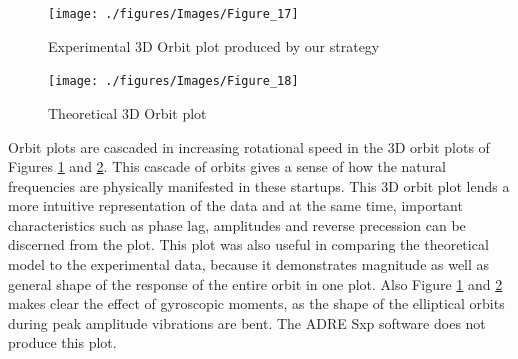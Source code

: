 		\begin{figure}[H]	
			\centering
			\texttt{[image: ./figures/Images/Figure\_17]}
			\caption{Experimental 3D Orbit plot produced by our strategy}
			\label{fig:Figure_17}
		\end{figure}
		\begin{figure}[H]	
			\centering
			\texttt{[image: ./figures/Images/Figure\_18]}
			\caption{Theoretical 3D Orbit plot}
			\label{fig:Figure_18}
		\end{figure}
		Orbit plots are cascaded in increasing rotational speed in the 3D orbit plots of Figures \ref{fig:Figure_17} and \ref{fig:Figure_18}. This cascade of orbits gives a sense of how the natural frequencies are physically manifested in these startups. This 3D orbit plot lends a more intuitive representation of the data and at the same time, important characteristics such as phase lag, amplitudes and reverse precession can be discerned from the plot. This plot was also useful in comparing the theoretical model to the experimental data, because it demonstrates magnitude as well as general shape of the response of the entire orbit in one plot. Also Figure \ref{fig:Figure_17} and \ref{fig:Figure_18} makes clear the effect of gyroscopic moments, as the shape of the elliptical orbits during peak amplitude vibrations are bent. The ADRE Sxp software does not produce this plot.\par 
